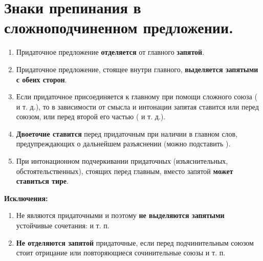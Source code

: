 \documentclass[main]{subfile}
\begin{document}
\section{Знаки препинания в сложноподчиненном предложении.}

\begin{enumerate}
      \item Придаточное предложение \textbf{отделяется} от главного \textbf{запятой}. \newline
      \item Придаточное предложение, стоящее внутри главного, \textbf{выделяется запятыми с обеих сторон}. \newline
      \item Если придаточное присоединяется к главному при помощи сложного союза ( и т. д.), то в зависимости от смысла и интонации запятая ставится или перед союзом, или перед второй его частью ( и т. д.). \newline
      \item \textbf{Двоеточие ставится} перед придаточным при наличии в главном слов, предупреждающих о дальнейшем разъяснении (можно подставить ). \newline
      \item При интонационном подчеркивании придаточных (изъяснительных, обстоятельственных), стоящих перед главным, вместо запятой \textbf{может ставиться тире}. \newline
\end{enumerate}

\textbf{Исключения:}
\begin{enumerate}
      \item Не являются придаточными и поэтому \textbf{не выделяются запятыми} устойчивые сочетания:  и т. п. \newline
      \item \textbf{Не отделяются запятой} придаточные, если перед подчинительным союзом стоит отрицание  или повторяющиеся сочинительные союзы  и т. п. \newline
\end{enumerate}
\end{document}
